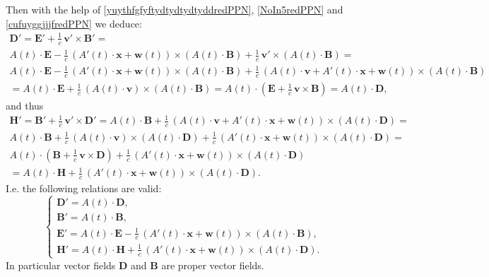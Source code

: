 \documentclass{article}
\theoremstyle{definition}
\theoremstyle{remark}
\renewcommand{\vec}[1]{\mathbf{#1}}
\newcommand{\er}{\eqref}
\newcommand{\er}{\eqref}
\begin{document}
Then with the help of \er{yuythfgfyftydtydtydtyddredPPN},
\er{NoIn5redPPN} and \er{cufuyggjjjfredPPN} we deduce:
\begin{multline*}
\vec D'=\vec E'+\frac{1}{c}\,\vec v'\times \vec B'=\\A(t)\cdot\vec
E-\frac{1}{c}\,\left(A'(t)\cdot\vec x+\vec w(t)\right)\times
\left(A(t)\cdot\vec B\right)+\frac{1}{c}\,\vec v'\times
\left(A(t)\cdot\vec B\right)=\\A(t)\cdot\vec
E-\frac{1}{c}\,\left(A'(t)\cdot\vec x+\vec w(t)\right)\times
\left(A(t)\cdot\vec B\right)+\frac{1}{c}\,\left(A(t)\cdot \vec
v+A'(t)\cdot\vec x+\vec w(t)\right)\times \left(A(t)\cdot\vec
B\right)\\=A(t)\cdot\vec E+\frac{1}{c}\,\left(A(t)\cdot \vec
v\right)\times \left(A(t)\cdot\vec B\right)=A(t)\cdot\left(\vec
E+\frac{1}{c}\,\vec v\times \vec B\right)=A(t)\cdot \vec D,
\end{multline*}
and thus
\begin{multline*}
\vec H'=\vec B'+\frac{1}{c}\,\vec v'\times \vec D'=A(t)\cdot\vec
B+\frac{1}{c}\,\left(A(t)\cdot \vec v+A'(t)\cdot\vec x+\vec
w(t)\right)\times \left(A(t)\cdot\vec D\right)=\\
A(t)\cdot\vec B+\frac{1}{c}\,\left(A(t)\cdot \vec v\right)\times
\left(A(t)\cdot\vec D\right)+\frac{1}{c}\,\left(A'(t)\cdot\vec
x+\vec
w(t)\right)\times \left(A(t)\cdot\vec D\right)=\\
A(t)\cdot\left(\vec B+\frac{1}{c}\,\vec v\times \vec
D\right)+\frac{1}{c}\,\left(A'(t)\cdot\vec x+\vec w(t)\right)\times
\left(A(t)\cdot\vec D\right)\\=A(t)\cdot\vec
H+\frac{1}{c}\,\left(A'(t)\cdot\vec x+\vec w(t)\right)\times
\left(A(t)\cdot\vec D\right).
\end{multline*}
I.e. the following relations are valid:
\begin{equation}\label{yuythfgfyftydtydtydtyddyyyhhddhhhredPPN}
\begin{cases}
\vec D'=A(t)\cdot \vec D,\\
\vec B'=A(t)\cdot\vec B,\\
\vec E'=A(t)\cdot\vec E-\frac{1}{c}\,\left(A'(t)\cdot\vec x+\vec
w(t)\right)\times \left(A(t)\cdot\vec B\right),\\
\vec H'=A(t)\cdot\vec H+\frac{1}{c}\,\left(A'(t)\cdot\vec x+\vec
w(t)\right)\times \left(A(t)\cdot\vec D\right).
\end{cases}
\end{equation}
In particular vector fields $\vec D$ and $\vec B$ are proper vector
fields.
\end{document}
